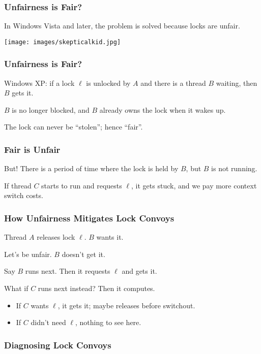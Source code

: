 \begin{frame}
\frametitle{Unfairness is Fair?}

In Windows Vista and later, the problem is solved because locks are unfair.

\begin{center}
	\texttt{[image: images/skepticalkid.jpg]}
\end{center}

\end{frame}

\begin{frame}
\frametitle{Unfairness is Fair?}

Windows XP: if a lock $\ell$ is unlocked by $A$ and there is a thread $B$ waiting, then $B$ gets it.

$B$ is no longer blocked, and $B$ already owns the lock when it wakes up.

The lock can never be ``stolen''; hence ``fair''.

\end{frame}

\begin{frame}
\frametitle{Fair is Unfair}


But! There is a period of time where the lock is held by $B$, but $B$ is not running.

If thread $C$ starts to run and requests $\ell$, it gets stuck, and we pay more context switch costs.


\end{frame}

\begin{frame}
\frametitle{How Unfairness Mitigates Lock Convoys}


Thread $A$ releases lock $\ell$. $B$ wants it.

Let's be unfair. $B$ doesn't get it.

Say $B$ runs next. Then it requests $\ell$ and gets it.

What if $C$ runs next instead? Then it computes.
\begin{itemize}
\item If $C$ wants $\ell$, it gets it; maybe releases before switchout.
\item If $C$ didn't need $\ell$, nothing to see here.
\end{itemize}


\end{frame}

\begin{frame}
\frametitle{Diagnosing Lock Convoys}

\begin{center}

\end{center}

\end{frame}

